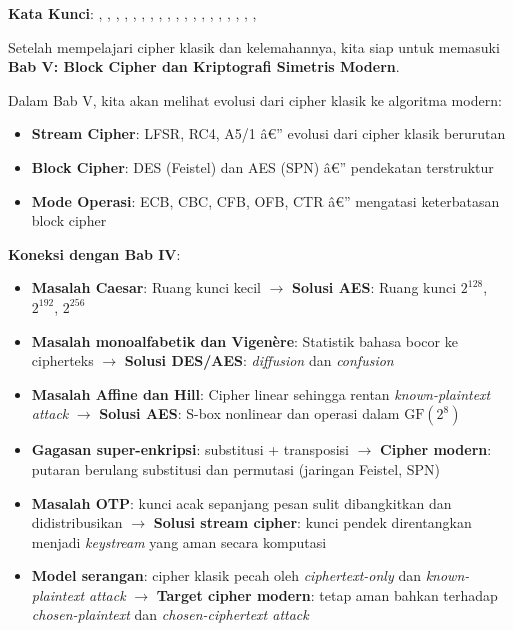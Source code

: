 \documentclass[main.tex]{subfiles}
\begin{document}
\begin{rangkuman}
\textbf{Kata Kunci}: , , , , , , , , , , , , , , , , , , , 
\end{rangkuman}

\begin{transition}
Setelah mempelajari cipher klasik dan kelemahannya, kita siap untuk memasuki \textbf{Bab V: Block Cipher dan Kriptografi Simetris Modern}.

Dalam Bab V, kita akan melihat evolusi dari cipher klasik ke algoritma modern:
\begin{itemize}
  \item \textbf{Stream Cipher}: LFSR, RC4, A5/1 â€” evolusi dari cipher klasik berurutan
  \item \textbf{Block Cipher}: DES (Feistel) dan AES (SPN) â€” pendekatan terstruktur
  \item \textbf{Mode Operasi}: ECB, CBC, CFB, OFB, CTR â€” mengatasi keterbatasan block cipher
\end{itemize}

\textbf{Koneksi dengan Bab IV}:
\begin{itemize}
  \item \textbf{Masalah Caesar}: Ruang kunci kecil $\rightarrow$ \textbf{Solusi AES}: Ruang kunci $2^{128}$, $2^{192}$, $2^{256}$
  \item \textbf{Masalah monoalfabetik dan Vigen\`{e}re}: Statistik bahasa bocor ke cipherteks $\rightarrow$ \textbf{Solusi DES/AES}: \textit{diffusion} dan \textit{confusion}
  \item \textbf{Masalah Affine dan Hill}: Cipher linear sehingga rentan \textit{known-plaintext attack} $\rightarrow$ \textbf{Solusi AES}: S-box nonlinear dan operasi dalam $\mathrm{GF}(2^8)$
  \item \textbf{Gagasan super-enkripsi}: substitusi + transposisi $\rightarrow$ \textbf{Cipher modern}: putaran berulang substitusi dan permutasi (jaringan Feistel, SPN)
  \item \textbf{Masalah OTP}: kunci acak sepanjang pesan sulit dibangkitkan dan didistribusikan $\rightarrow$ \textbf{Solusi stream cipher}: kunci pendek direntangkan menjadi \textit{keystream} yang aman secara komputasi
  \item \textbf{Model serangan}: cipher klasik pecah oleh \textit{ciphertext-only} dan \textit{known-plaintext attack} $\rightarrow$ \textbf{Target cipher modern}: tetap aman bahkan terhadap \textit{chosen-plaintext} dan \textit{chosen-ciphertext attack}
\end{itemize}


\end{transition}
\end{document}
